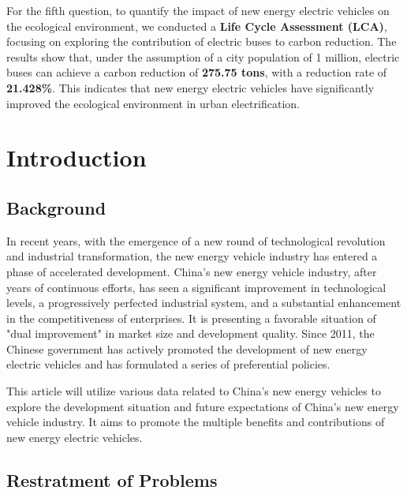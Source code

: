 \documentclass{apmcmthesis}
\begin{document}
For the fifth question, to quantify the impact of new energy electric vehicles on the ecological environment, we conducted a \textbf{Life Cycle Assessment (LCA)}, focusing on exploring the contribution of electric buses to carbon reduction. The results show that, under the assumption of a city population of 1 million, electric buses can achieve a carbon reduction of \textbf{275.75 tons}, with a reduction rate of \textbf{21.428\%}. This indicates that new energy electric vehicles have significantly improved the ecological environment in urban electrification.


\newpage
\tableofcontents


\newpage
\pagestyle{mainmatterstyle}
\setcounter{page}{1}
\section{Introduction}
\subsection{Background}
In recent years, with the emergence of a new round of technological revolution and industrial transformation, the new energy vehicle industry has entered a phase of accelerated development. China's new energy vehicle industry, after years of continuous efforts, has seen a significant improvement in technological levels, a progressively perfected industrial system, and a substantial enhancement in the competitiveness of enterprises. It is presenting a favorable situation of "dual improvement" in market size and development quality. Since 2011, the Chinese government has actively promoted the development of new energy electric vehicles and has formulated a series of preferential policies.

This article will utilize various data related to China's new energy vehicles to explore the development situation and future expectations of China's new energy vehicle industry. It aims to promote the multiple benefits and contributions of new energy electric vehicles.
\subsection{Restratment of Problems}
\end{document}
